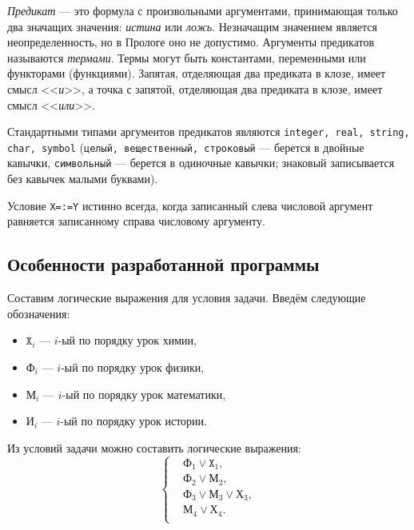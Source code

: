 \textit{Предикат} --- это формула с произвольными аргументами, принимающая
только два  значащих значения: \textit{истина} или \textit{ложь}.
Незначащим значением является неопределенность, но в Прологе оно не допустимо.
Аргументы предикатов называются \textit{термами}. Термы могут быть константами,
переменными или функторами (функциями).
Запятая, отделяющая два предиката в клозе, имеет смысл <<\textit{и}>>,
а точка с запятой, отделяющая два предиката в клозе, имеет смысл <<\textit{или}>>.

Стандартными типами аргументов предикатов являются
\texttt{integer, real, string, char, symbol} (\texttt{целый, вещественный,
строковый} --- берется в двойные кавычки,
\texttt{символьный} --- берется в одиночные кавычки;
знаковый записывается без кавычек малыми буквами).

Условие \texttt{X=:=Y} истинно всегда, когда записанный слева числовой аргумент равняется
записанному справа числовому аргументу.


\subsection{Особенности разработанной программы}

Составим логические выражения для условия задачи. Введём следующие обозначения:

\begin{itemize}
  \item $\texttt{X}_{i}$ --- $i$-ый по порядку урок химии,
  \item $\texttt{Ф}_{i}$ --- $i$-ый по порядку урок физики,
  \item $\texttt{М}_{i}$ --- $i$-ый по порядку урок математики,
  \item $\texttt{И}_{i}$ --- $i$-ый по порядку урок истории.
\end{itemize}

Из условий задачи можно составить логические выражения:
\begin{equation*}
  \left\{
    \begin{aligned}
      &\texttt{Ф}_1 \lor \texttt{X}_1, \\
      &\texttt{Ф}_2 \lor \texttt{М}_2, \\
      &\texttt{Ф}_3 \lor \texttt{М}_3 \lor \texttt{Х}_3, \\
      &\texttt{М}_4 \lor \texttt{Х}_4. \\
    \end{aligned}
  \right.
\end{equation*}

